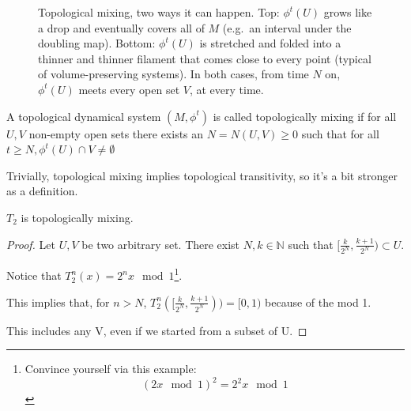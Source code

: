 \begin{figure}[ht]
    \caption{Topological mixing, two ways it can happen. Top: $\phi^t(U)$ grows like a drop and
    eventually covers all of $M$ (e.g.\ an interval under the doubling map). Bottom: $\phi^t(U)$
    is stretched and folded into a thinner and thinner filament that comes close to every point
    (typical of volume-preserving systems). In both cases, from time $N$ on, $\phi^t(U)$ meets
    every open set $V$, at every time.}
    \label{fig:top_mixing}
\end{figure}

\begin{definition}
    A topological dynamical system $(M, \phi^t)$ is called topologically mixing if for all $U, V$ non-empty open sets there exists an $N=N(U, V)\geq 0$ such that for all $t\geq N, \phi^t(U)\cap V\neq\emptyset$
\end{definition}

Trivially, topological mixing implies topological transitivity, so it's a bit stronger as a definition.

\begin{proposition}
    $T_2$ is topologically mixing.
\end{proposition}
\begin{proof}
    Let $U, V$ be two arbitrary set. There exist $N, k \in\mathbb{N}$ such that $[\frac{k}{2^N}, \frac{k+1}{2^N})\subset U$.
    
    Notice that $T^n_2(x)=2^nx\mod 1$\footnote{Convince yourself via this example: \begin{equation*}
    (2x \mod 1)^2=2^2x \mod 1 
    \end{equation*}}.

    This implies that, for $n>N$, $T^n_2([\frac{k}{2^N}, \frac{k+1}{2^N}))=[0,1)$ because of the mod 1.
    
    This includes any V, even if we started from a subset of U.
\end{proof}

